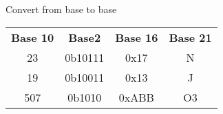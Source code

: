 \documentclass{article}
\begin{document}
Convert from base to base\\
\begin{tabular}{c|c|c|c}
\textbf{Base 10}&\textbf{Base2}&\textbf{Base 16} & \textbf{Base 21}\\
23 & 0b10111 & 0x17 & N \\
19 & 0b10011 & 0x13 & J \\
507 & 0b1010 & 0xABB & O3 \\
\hline
\hline
\end{tabular}
\end{document}
